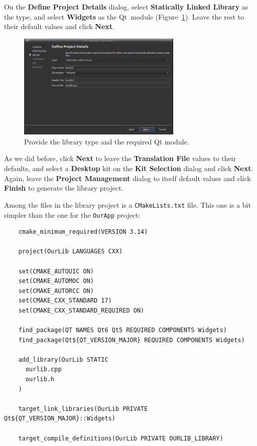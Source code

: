 \documentclass[letterpaper]{article}
\begin{document}
  On the \textbf{Define Project Details} dialog, select \textbf{Statically Linked Library}
  as the type, and select \textbf{Widgets} as the Qt~module (Figure~\ref{fig:create_ourlib_4}).
  Leave the rest to their default values and click \textbf{Next}.
  \begin{figure}[H]
    \centering
    \includegraphics[width=0.7\textwidth]{create_ourlib_4.png}
    \caption{Provide the library type and the required Qt module.}
    \label{fig:create_ourlib_4}
  \end{figure}

  As we did before, click \textbf{Next} to leave the \textbf{Translation File} values to
  their defaults, and select a \textbf{Desktop} kit on the \textbf{Kit Selection} dialog
  and click \textbf{Next}. Again, leave the \textbf{Project Management} dialog to itself
  default values and click \textbf{Finish} to generate the library project.

  Among the files in the library project is a \verb|CMakeLists.txt| file. This one is a bit
  simpler than the one for the \verb|OurApp| project:
  \begin{lstlisting}
    cmake_minimum_required(VERSION 3.14)

    project(OurLib LANGUAGES CXX)
    
    set(CMAKE_AUTOUIC ON)
    set(CMAKE_AUTOMOC ON)
    set(CMAKE_AUTORCC ON)
    set(CMAKE_CXX_STANDARD 17)
    set(CMAKE_CXX_STANDARD_REQUIRED ON)
    
    find_package(QT NAMES Qt6 Qt5 REQUIRED COMPONENTS Widgets)
    find_package(Qt${QT_VERSION_MAJOR} REQUIRED COMPONENTS Widgets)
    
    add_library(OurLib STATIC
      ourlib.cpp
      ourlib.h
    )
    
    target_link_libraries(OurLib PRIVATE Qt${QT_VERSION_MAJOR}::Widgets)
    
    target_compile_definitions(OurLib PRIVATE OURLIB_LIBRARY)    
  \end{lstlisting}
\end{document}
